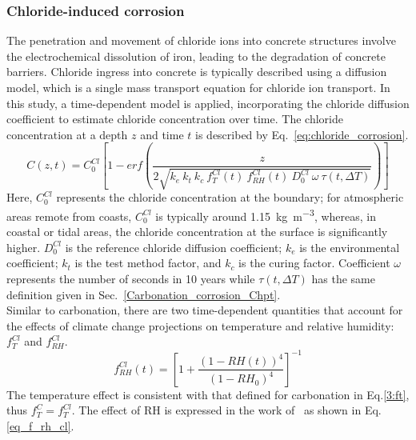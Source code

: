 \subsubsection{Chloride-induced corrosion}\label{Chloride_corrosion_Chpt}
The penetration and movement of chloride ions into concrete structures involve the electrochemical dissolution of iron, leading to the degradation of concrete barriers.
Chloride ingress into concrete is typically described using a diffusion model, which is a single mass transport equation for chloride ion transport.
In this study, a time-dependent model is applied, incorporating the chloride diffusion coefficient to estimate chloride concentration over time. The chloride concentration at a depth $z$ and time $t$ is described by Eq.~\ref{eq:chloride_corrosion}.
\begin{equation}
    \label{eq:chloride_corrosion}
    C(z, t) = C_0^{Cl} \left[ 1-erf \left(\frac{z}{2\sqrt{k_e \ k_t \ k_c \ f_T^{Cl}(t) \ f_{RH}^{Cl}(t) \ D_0^{Cl} \ \omega \ \tau(t, \Delta T)}} \right) \right]
\end{equation}
Here, $C_0^{Cl}$ represents the chloride concentration at the boundary; for atmospheric areas remote from coasts, $C_0^{Cl}$ is typically around \SI{1.15}{\kilogram\per\cubic\meter}, whereas, in coastal or tidal areas, the chloride concentration at the surface is significantly higher. $D_0^{Cl}$ is the reference chloride diffusion coefficient; $k_e$ is the environmental coefficient; $k_t$ is the test method factor, and $k_c$ is the curing factor. 
Coefficient $\omega$ represents the number of seconds in 10 years while $\tau(t, \Delta T)$ has the same definition given in Sec.~\ref{Carbonation_corrosion_Chpt}.\\
Similar to carbonation, there are two time-dependent quantities that account for the effects of climate change projections on temperature and relative humidity: $f_{T}^{Cl}$ and $f_{RH}^{Cl}$.
\begin{equation}
    \label{eq_f_rh_cl}
    f_{RH}^{Cl}(t) = \left[ 1 + \frac{(1-RH(t))^4}{(1-RH_0)^4} \right]^{-1}
\end{equation}
The temperature effect is consistent with that defined for carbonation in Eq.\ref{3:ft}, thus $f_T^C = f_T^{Cl}$. The effect of RH is expressed in the work of~\textcite{f_RH_ClELHASSAN} as shown in Eq.\ref{eq_f_rh_cl}.

